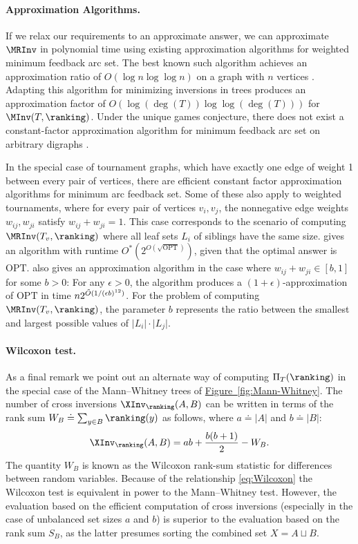 \documentclass[11pt]{article}
\numberwithin{equation}{section}
\theoremstyle{definition}
\theoremstyle{plain}
\newcommand{\expref}[2]{\hyperref[#2]{#1~\ref{#2}}}
\begin{document}
\paragraph{Approximation Algorithms.} If we relax our requirements to an approximate answer, we can approximate $\MRInv$ in polynomial time using existing approximation algorithms for weighted minimum feedback arc set. The best known such algorithm achieves an approximation ratio of $O(\log n\log\log n)$ on a graph with $n$ vertices \cite{ENSS98}. Adapting this algorithm for minimizing inversions in trees produces an approximation factor of $O(\log (\deg(T)) \log\log (\deg(T)))$ for $\MInv(T,\ranking)$. Under the unique games conjecture, there does not exist a constant-factor approximation algorithm for minimum feedback arc set on arbitrary digraphs \cite{GHMRC11}.

In the special case of tournament graphs, which have exactly one edge of weight 1 between every pair of vertices, there are efficient constant factor approximation algorithms for minimum arc feedback set. Some of these also apply to weighted tournaments, where for every pair of vertices $v_i,v_j$, the nonnegative edge weights $w_{ij},w_{ji}$ satisfy $w_{ij}+w_{ji}=1$. This case corresponds to the scenario of computing $\MRInv(T_v,\ranking)$ where all leaf sets $L_i$ of siblings have the same size. \cite{KS10} gives an algorithm with runtime $O^*(2^{O(\sqrt{\mathrm{OPT}})})$, given that the optimal answer is $\mathrm{OPT}$. \cite{KMS07} also gives an approximation algorithm in the case where $w_{ij}+w_{ji}\in [b,1]$ for some $b>0$: For any $\epsilon>0$, the algorithm produces a $(1+\epsilon)$-approximation of $\mathrm{OPT}$ in time $n 2^{\Tilde{O}(1/(\epsilon b)^{12}) }$. For the problem of computing $\MRInv(T_v,\ranking)$, the parameter $b$ represents the ratio between the smallest and largest possible values of $\lvert L_i\rvert\cdot\lvert L_j\rvert$.

\paragraph{Wilcoxon test.} As a final remark we point out an alternate way of computing $\Pi_T(\ranking)$ in the special case of the Mann--Whitney trees of \expref{Figure}{fig:Mann-Whitney}. The number of cross inversions $\XInv_\ranking(A,B)$ can be written in terms of the rank sum $W_B \doteq \sum_{y \in B} \ranking(y)$ as follows, where $a \doteq |A|$ and $b \doteq |B|$:
\begin{equation}\label{eq:Wilcoxon}
\XInv_\ranking(A,B) = ab + \frac{b(b+1)}{2} - W_B.
\end{equation}
The quantity $W_B$ is known as the Wilcoxon rank-sum statistic for differences between random variables. Because of the relationship \eqref{eq:Wilcoxon} the Wilcoxon test is equivalent in power to the Mann--Whitney test. However, the evaluation based on the efficient computation of cross inversions (especially in the case of unbalanced set sizes $a$ and $b$) is superior to the evaluation based on the rank sum $S_B$, as the latter presumes sorting the combined set $X = A \sqcup B$.
\end{document}

